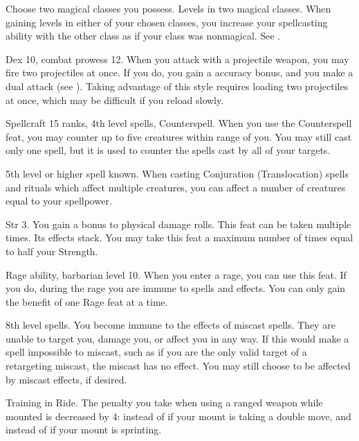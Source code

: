 Choose two magical classes you possess.
\featpres
Levels in two magical classes.
\featben When gaining levels in either of your chosen classes, you increase your spellcasting ability with the other class as if your class was nonmagical.
See .

\featpres Dex 10, combat prowess 12.
\featben When you attack with a projectile weapon, you may fire two projectiles at once.
If you do, you gain a  accuracy bonus, and you make a dual attack (see ).
Taking advantage of this style requires loading two projectiles at once, which may be difficult if you reload slowly.

\featpres Spellcraft 15 ranks, 4th level spells, Counterspell.
\featben When you use the Counterspell feat, you may counter up to five creatures within \rngmed range of you.
You may still cast only one spell, but it is used to counter the spells cast by all of your targets.

\featpre 5th level or higher  spell known.
\featben When casting Conjuration (Translocation) spells and rituals which affect multiple creatures, you can affect a number of creatures equal to your spellpower.

\featpres Str 3.
\featben You gain a  bonus to physical damage rolls.
 This feat can be taken multiple times. Its effects stack.
You may take this feat a maximum number of times equal to half your Strength.

\featpre Rage ability, barbarian level 10.
\featben When you enter a rage, you can use this feat. If you do, during the rage you are immune to  spells and effects.
 You can only gain the benefit of one Rage feat at a time.

\featpre 8th level spells.
\featben You become immune to the effects of miscast spells.
They are unable to target you, damage you, or affect you in any way.
If this would make a spell impossible to miscast, such as if you are the only valid target of a retargeting miscast, the miscast has no effect.
You may still choose to be affected by miscast effects, if desired.

\featpre Training in Ride.
\featben The penalty you take when using a ranged weapon while mounted is decreased by 4:  instead of  if your mount is taking a double move, and  instead of  if your mount is sprinting.

